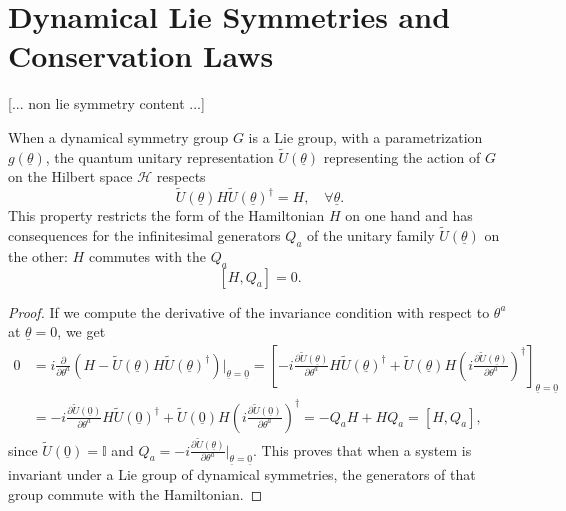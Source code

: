 \section{Dynamical Lie Symmetries and Conservation Laws}

 [... non lie symmetry content ...]

When a dynamical symmetry group \(G\) is a Lie group, with a parametrization \(g(\underline{\theta})\), the quantum unitary representation \(\tilde{U}(\underline{\theta})\) representing the action of \(G\) on the Hilbert space \(\mathcal{H}\) respects
\[
    \tilde{U}(\underline{\theta})  H \tilde{U}(\underline{\theta})^\dagger = H, \quad \forall \underline{\theta}.
\]
This property restricts the form of the Hamiltonian \(H\) on one hand and has consequences for the infinitesimal generators \(Q_a\) of the unitary family \(\tilde{U}(\underline{\theta})\) on the other: \(H\) commutes with the \(Q_a\)
\[
    [H, Q_a] = 0.
\]
\begin{proof}
    If we compute the derivative of the invariance condition with respect to \(\theta^a\) at \(\underline{\theta} = 0\), we get
    \[
        \begin{aligned}
            0 & = i \frac{\partial}{\partial \theta^a} (H - \tilde{U}(\underline{\theta}) H \tilde{U}(\underline{\theta})^\dagger) \bigg|_{\underline{\theta} = \underline{0}} = \left[ -i \frac{\partial \tilde{U}(\underline{\theta})}{\partial \theta^a} H \tilde{U}(\underline{\theta})^\dagger + \tilde{U}(\underline{\theta})H\left( i \frac{\partial \tilde{U}(\underline{\theta})}{\partial \theta^a}\right)^{\dagger} \right]_{\underline{\theta} = \underline{0}} \\
              & = -i \frac{\partial \tilde{U}(\underline{0})}{\partial \theta^a} H \tilde{U}(\underline{0})^\dagger + \tilde{U}(\underline{0})H\left( i \frac{\partial \tilde{U}(\underline{0})}{\partial \theta^a}\right)^{\dagger} = - Q_a H + H Q_a = [H, Q_a],
        \end{aligned}
    \]
    since \(\tilde{U}(\underline{0}) = \mathbb{I}\) and \(Q_a = -i \frac{\partial \tilde{U}(\underline{\theta})}{\partial \theta^a} \big|_{\underline{\theta} = \underline{0}}\). This proves that when a system is invariant under a Lie group of dynamical symmetries, the generators of that group commute with the Hamiltonian.
\end{proof}

